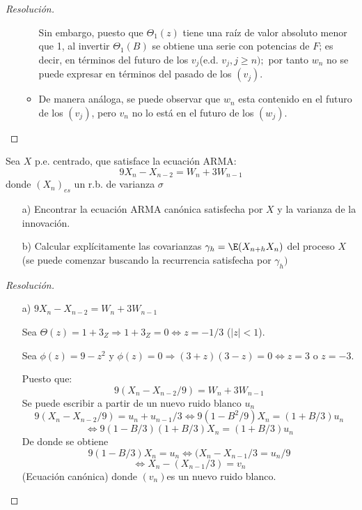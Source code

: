 \begin{ejemplo}
\begin{proof}[Resoluci\'{o}n]
\begin{enumerate}
\begin{itemize}
Sin embargo, puesto que $\Theta_{1} (z)$ tiene una ra\'{i}z de valor absoluto menor que 1, al invertir $\Theta_{1} (B)$ se obtiene una serie con potencias de $F$; es decir, en t\'{e}rminos del futuro de los $v_{j} $(e.d. $v_{j}, j\ge n);$ por tanto $w_{{n}}$ no se puede expresar en t\'{e}rminos del pasado de los $(v_{j})$.

\item De manera an\'{a}loga, se puede observar que $w_{{n}}$ esta contenido en el futuro de los $(v_{{j}})$, pero $v_{n}$ no lo est\'{a} en el futuro de los $(w_{{j}})$.
\end{itemize} 
\end{enumerate}
\end{proof}
\end{ejemplo}


\begin{ejemplo}
Sea $X$ p.e. centrado, que satisface la ecuaci\'{o}n ARMA:
\[
9X_{n} -X_{n-2} =W_{n} +3W_{n-1} 
\]
donde $( X_{n} )_{es }$ un r.b. de varianza $\sigma $

\begin{enumerate}
\item[a)] Encontrar la ecuaci\'{o}n ARMA can\'{o}nica satisfecha por $X$ y la varianza de la innovaci\'{o}n. 
\item[b)] Calcular expl\'{i}citamente las covarianzas $\gamma_{h} =\E(X_{n+h} X_{n} )$ del proceso $X$ (se puede comenzar buscando la recurrencia satisfecha por $\gamma_{h})$
\end{enumerate}

\begin{proof}[Resoluci\'{o}n]
\quad
\begin{enumerate}
\item[a)] $9X_{n} -X_{n-2} =W_{n} +3W_{n-1} $

Sea $\Theta (z)=1+3_{Z} \Rightarrow 1+3_{Z} =0 \Leftrightarrow z=-1/3$ ($\left| z \right|<1$).\newline

Sea $\phi (z)=9-z^{2}$ y $\phi (z)=0\Rightarrow(3+z)(3-z)=0\Leftrightarrow z=3$ o $z=-3$.

Puesto que:
\[
9(X_{n} -X_{n-2} /9)=W_{n} +3W_{n-1} 
\]
Se puede escribir a partir de un nuevo ruido blanco $u_{n}$
\[
9(X_{n} -X_{n-2} /9)=u_{n} +u_{n-1} /3\Leftrightarrow 9(1-B^{2}/9)X_{n} =(1+B/3)u_{n} 
\]
\[
\Leftrightarrow 9(1-B/3)(1+B/3)X_{n} =(1+B/3)u_{n} 
\]
De donde se obtiene 
\[
9(1-B/3)X_{n} =u_{n} \Leftrightarrow (X_{n} -X_{n-1} /3=u_{n} /9
\]
\[
 \Leftrightarrow X_{n} -(X_{n-1} /3)=v_{n}
\]
(Ecuaci\'{o}n can\'{o}nica) donde $(v_{n} )$es un nuevo ruido blanco.\newline


\end{enumerate}
\end{proof}
\end{ejemplo}
